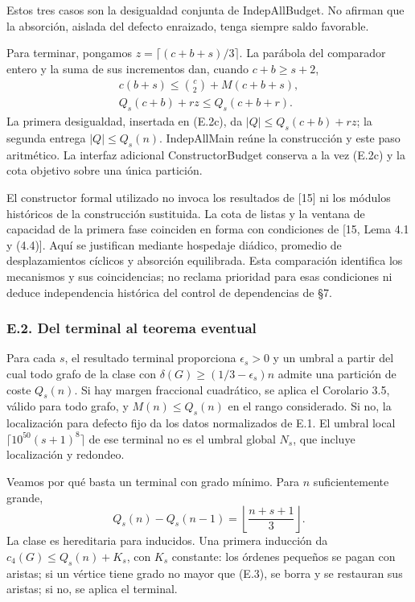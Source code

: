 \documentclass[spanish,11pt,a4paper]{article}
\begin{document}
Estos tres casos son la desigualdad conjunta de IndepAllBudget. No afirman que la absorción, aislada del defecto enraizado, tenga siempre saldo favorable.

Para terminar, pongamos \(z=\lceil(c+b+s)/3\rceil\). La parábola del comparador entero y la suma de sus incrementos dan, cuando \(c+b\ge s+2\), \[
\begin{gathered}
c(b+s)\le\binom c2+M(c+b+s),\\
Q_s(c+b)+rz\le Q_s(c+b+r).
\end{gathered}
\tag{E.2e}
\] La primera desigualdad, insertada en (E.2c), da \(|Q|\le Q_s(c+b)+rz\); la segunda entrega \(|Q|\le Q_s(n)\). IndepAllMain reúne la construcción y este paso aritmético. La interfaz adicional ConstructorBudget conserva a la vez (E.2c) y la cota objetivo sobre una única partición.

El constructor formal utilizado no invoca los resultados de {[}15{]} ni los módulos históricos de la construcción sustituida. La cota de listas y la ventana de capacidad de la primera fase coinciden en forma con condiciones de {[}15, Lema 4.1 y (4.4){]}. Aquí se justifican mediante hospedaje diádico, promedio de desplazamientos cíclicos y absorción equilibrada. Esta comparación identifica los mecanismos y sus coincidencias; no reclama prioridad para esas condiciones ni deduce independencia histórica del control de dependencias de §7.

\subsubsection{E.2. Del terminal al teorema eventual}\label{e.2.-del-terminal-al-teorema-eventual}

Para cada \(s\), el resultado terminal proporciona \(\epsilon_s>0\) y un umbral a partir del cual todo grafo de la clase con \(\delta(G)\ge(1/3-\epsilon_s)n\) admite una partición de coste \(Q_s(n)\). Si hay margen fraccional cuadrático, se aplica el Corolario 3.5, válido para todo grafo, y \(M(n)\le Q_s(n)\) en el rango considerado. Si no, la localización para defecto fijo da los datos normalizados de E.1. El umbral local \(\lceil10^{50}(s+1)^8\rceil\) de ese terminal no es el umbral global \(N_s\), que incluye localización y redondeo.

Veamos por qué basta un terminal con grado mínimo. Para \(n\) suficientemente grande, \[
Q_s(n)-Q_s(n-1)=\left\lfloor\frac{n+s+1}{3}\right\rfloor.
\tag{E.3}
\] La clase es hereditaria para inducidos. Una primera inducción da \(c_4(G)\le Q_s(n)+K_s\), con \(K_s\) constante: los órdenes pequeños se pagan con aristas; si un vértice tiene grado no mayor que (E.3), se borra y se restauran sus aristas; si no, se aplica el terminal.
\end{document}
